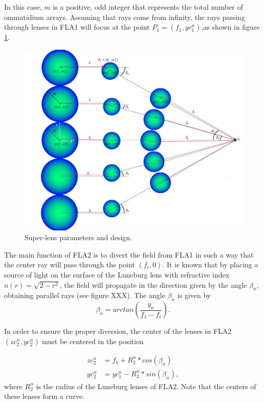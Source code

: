 In this case, $m$ is a positive, odd integer that represents the total number of ommatidium arrays. Assuming that rays come from infinity, the rays passing through lenses in FLA1 will focus at the point $P_1=(f_1,yc_1^n)$,as shown in figure \ref{fig:design}. \\

\begin{figure}[H]
    \centering
    \includegraphics[scale=0.40]{Figures/Superlens_Design_Parameters.png}
    \caption{Super-lens parameters and design.}
    \label{fig:design} 
\end{figure}

The main function of FLA2 is to divert the field from FLA1 in such a way that the center ray will pass through the point $(f_t,0)$. It is known that by placing a source of light on the surface of the Luneburg lens with refractive index $n(r) = \sqrt{2-r^2}$, the field will propagate in the direction given by the angle $\beta_n$, obtaining parallel rays (see figure XXX). The angle $\beta_n$ is given by
\begin{equation}
    \beta_n = arctan(\frac{y_n}{f_1-f_t}).
\end{equation}

In order to ensure the proper diversion, the center of the lenses in FLA2 $(zc_2^n,yc_2^n)$ must be centered in the position

\begin{equation}
\begin{split}
    zc_2^n &= f_1 + R_2^n*cos(\beta_n) \\
    yc_2^n &= yc_1^n - R_2^n*sin(\beta_n),
\end{split}
\end{equation}
where $R_2^n$ is the radius of the Luneburg lenses of FLA2. Note that the centers of these lenses form a curve. \\

